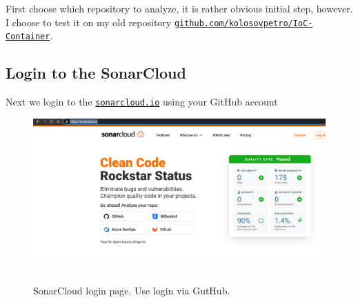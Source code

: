 First choose which repository to analyze, it is rather obvious initial step, however.
I choose to test it on my old repository
\href{https://github.com/kolosovpetro/IoC-Container}{\texttt{github.com/kolosovpetro/IoC-Container}}.

\subsection{Login to the SonarCloud}\label{subsec:login-to-the-sonarqube}
Next we login to the \href{https://sonarcloud.io/}{\texttt{sonarcloud.io}} using your GitHub account
\begin{figure}[H]
    \centering
    \includegraphics[width=1\textwidth]{img/01_sonarcloud_login_page}
    ~\caption{SonarCloud login page. Use login via GutHub.}\label{fig:figure}
\end{figure}

